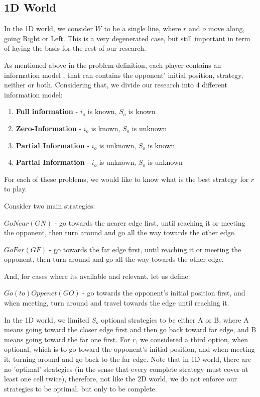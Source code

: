 \documentclass[a4paper,english,10pt]{article}
\newcommand\rob{\ensuremath{r}\xspace}
\newcommand\opp{\ensuremath{o}\xspace}
\newcommand{\w}{\ensuremath{W}\xspace}
\newcommand{\gn}{\ensuremath{GN}\xspace}
\newcommand{\gf}{\ensuremath{GF}\xspace}
\newcommand{\go}{\ensuremath{GO}\xspace}
\begin{document}
\subsection{1D World}
In the 1D world, we consider \w to be a single line, where \rob and \opp move along, going Right or Left. This is a very degenerated case, but still important in term of laying the basis for the rest of our research.

As mentioned above in the problem definition, each player contains an information model , that can contains the opponent' initial position, strategy, neither or both. Considering that, we divide our research into 4 different information model:
\begin{enumerate}
\item \textbf{Full information} - $i_\opp$ is known, $S_\opp$ is known
\item \textbf{Zero-Information} - $i_\opp$ is known, $S_\opp$ is unknown
\item \textbf{Partial Information} -  $i_\opp$ is unknown, $S_\opp$ is known
\item \textbf{Partial Information} - $i_\opp$ is unknown, $S_\opp$ is unknown
\end{enumerate}

For each of these problems, we would like to know what is the best strategy for \rob to play.

Consider two main strategies:

$GoNear(\gn)$ - go towards the nearer edge first, until reaching it or meeting the opponent, then turn around and go all the way towards the other edge.

$GoFar(\gf)$ - go towards the far edge first, until reaching it or meeting the opponent, then turn around and go all the way towards the other edge.

And, for cases where its available and relevant, let us define:

$Go(to)Oppenet(\go)$ - go towards the opponent's initial position first, and when meeting, turn around and travel towards the edge until reaching it.

In the 1D world, we limited $S_\opp$ optional strategies to be either A or B, where A means going toward the closer edge first and then go back toward far edge, and B means going toward the far one first. For \rob, we considered a third option, when optional, which is to go toward the opponent's initial position, and when meeting it, turning around and go back to the far edge.
Note that in 1D world, there are no 'optimal' strategies (in the sense that every complete strategy must cover at least one cell twice), therefore, not like the 2D world, we do not enforce our strategies to be optimal, but only to be complete.
\end{document}
